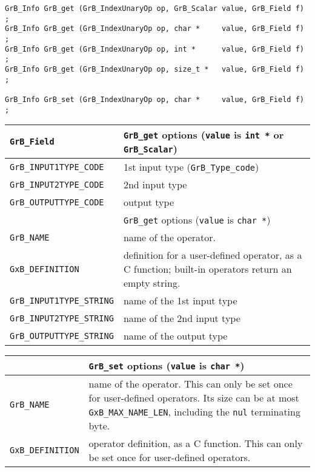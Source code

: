 \begin{mdframed}[userdefinedwidth=6in]
{\footnotesize
\begin{verbatim}
GrB_Info GrB_get (GrB_IndexUnaryOp op, GrB_Scalar value, GrB_Field f) ;
GrB_Info GrB_get (GrB_IndexUnaryOp op, char *     value, GrB_Field f) ;
GrB_Info GrB_get (GrB_IndexUnaryOp op, int *      value, GrB_Field f) ;
GrB_Info GrB_get (GrB_IndexUnaryOp op, size_t *   value, GrB_Field f) ;

GrB_Info GrB_set (GrB_IndexUnaryOp op, char *     value, GrB_Field f) ;
\end{verbatim}
}\end{mdframed}

\noindent
{\small
\begin{tabular}{p{2.2in}p{3.5in}}
\hline
\hline
\verb'GrB_Field'                    & \verb'GrB_get' options (\verb'value' is \verb'int *' or \verb'GrB_Scalar') \\
\hline
\verb'GrB_INPUT1TYPE_CODE'          & 1st input type (\verb'GrB_Type_code') \\
\verb'GrB_INPUT2TYPE_CODE'          & 2nd input type \\
\verb'GrB_OUTPUTTYPE_CODE'          & output type \\
\hline
\hline
                                    & \verb'GrB_get' options (\verb'value' is \verb'char *') \\
\hline
\verb'GrB_NAME'                     & name of the operator. \\
\verb'GxB_DEFINITION'               & definition for a user-defined operator, as a C function; built-in operators
                                        return an empty string. \\
\verb'GrB_INPUT1TYPE_STRING'        & name of the 1st input type \\
\verb'GrB_INPUT2TYPE_STRING'        & name of the 2nd input type \\
\verb'GrB_OUTPUTTYPE_STRING'        & name of the output type \\
\hline
\end{tabular}
}

\noindent
{\small
\begin{tabular}{p{2.2in}p{3.5in}}
\hline
                                    & \verb'GrB_set' options (\verb'value' is \verb'char *') \\
\hline
\verb'GrB_NAME'                     & name of the operator.  This can only be set once for user-defined operators.
                                        Its size can be at most \verb'GxB_MAX_NAME_LEN', including the
                                        \verb'nul' terminating byte. \\
\verb'GxB_DEFINITION'               & operator definition, as a C function.  This can only be
                                        set once for user-defined operators. \\
\hline
\end{tabular}
}

